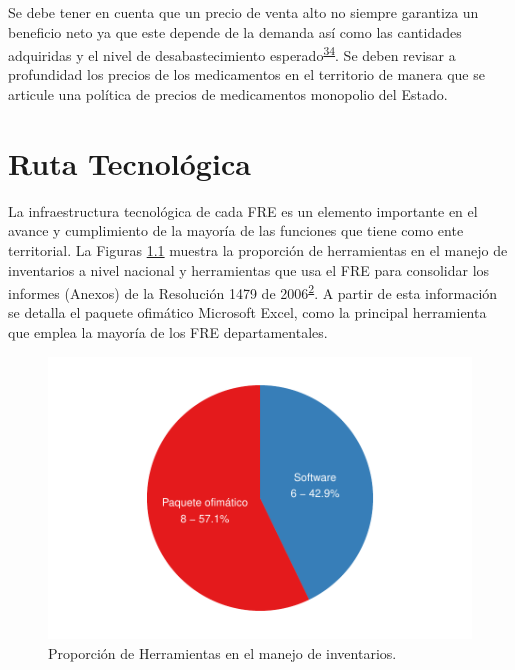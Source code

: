 \documentclass[
  oneside]{book}
\begin{document}
Se debe tener en cuenta que un precio de venta alto no siempre garantiza un beneficio neto ya que este depende de la demanda así como las cantidades adquiridas y el nivel de desabastecimiento esperado\textsuperscript{\protect\hyperlink{ref-Silver2017}{34}}. Se deben revisar a profundidad los precios de los medicamentos en el territorio de manera que se articule una política de precios de medicamentos monopolio del Estado.

\hypertarget{ruta-tecnoluxf3gica}{%
\chapter{Ruta Tecnológica}\label{ruta-tecnoluxf3gica}}


La infraestructura tecnológica de cada FRE es un elemento importante en el avance y cumplimiento de la mayoría de las funciones que tiene como ente territorial. La Figuras \ref{fig:PropHerramientasManejoInventarios} muestra la proporción de herramientas en el manejo de inventarios a nivel nacional y herramientas que usa el FRE para consolidar los informes (Anexos) de la Resolución 1479 de 2006\textsuperscript{\protect\hyperlink{ref-MSPS1479-2006}{2}}. A partir de esta información se detalla el paquete ofimático Microsoft Excel, como la principal herramienta que emplea la mayoría de los FRE departamentales.

\begin{figure}

{\centering \includegraphics[width=0.85\linewidth]{InformeFinal_files/figure-latex/PropHerramientasManejoInventarios-1} 

}

\caption{Proporción de Herramientas en el manejo de inventarios.}\label{fig:PropHerramientasManejoInventarios}
\end{figure}
\end{document}

